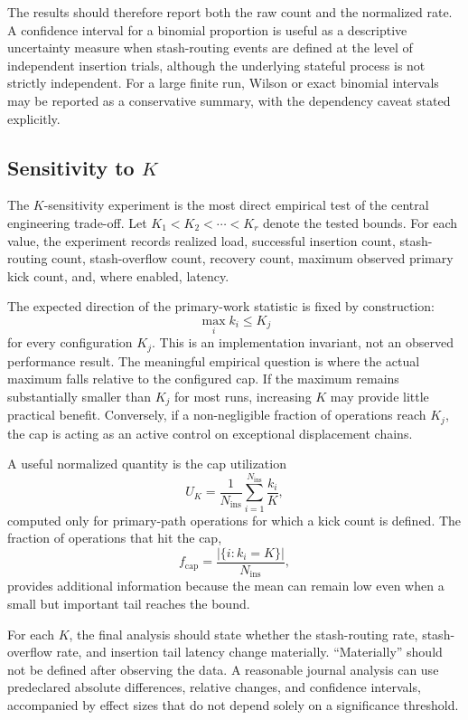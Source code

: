 \documentclass[conference]{IEEEtran}
\begin{document}
The results should therefore report both the raw count and the normalized rate. A confidence interval for a binomial proportion is useful as a descriptive uncertainty measure when stash-routing events are defined at the level of independent insertion trials, although the underlying stateful process is not strictly independent. For a large finite run, Wilson or exact binomial intervals may be reported as a conservative summary, with the dependency caveat stated explicitly.

\subsection{Sensitivity to $K$}
\label{subsec:k_results}

The $K$-sensitivity experiment is the most direct empirical test of the central engineering trade-off. Let $K_1<K_2<\cdots<K_r$ denote the tested bounds. For each value, the experiment records realized load, successful insertion count, stash-routing count, stash-overflow count, recovery count, maximum observed primary kick count, and, where enabled, latency.

The expected direction of the primary-work statistic is fixed by construction:
\begin{equation}
\max_i k_i \leq K_j
\end{equation}
for every configuration $K_j$. This is an implementation invariant, not an observed performance result. The meaningful empirical question is where the actual maximum falls relative to the configured cap. If the maximum remains substantially smaller than $K_j$ for most runs, increasing $K$ may provide little practical benefit. Conversely, if a non-negligible fraction of operations reach $K_j$, the cap is acting as an active control on exceptional displacement chains.

A useful normalized quantity is the cap utilization
\begin{equation}
U_K = \frac{1}{N_{\mathrm{ins}}}
\sum_{i=1}^{N_{\mathrm{ins}}}
\frac{k_i}{K},
\end{equation}
computed only for primary-path operations for which a kick count is defined. The fraction of operations that hit the cap,
\begin{equation}
f_{\mathrm{cap}} =
\frac{|\{i:k_i=K\}|}{N_{\mathrm{ins}}},
\end{equation}
provides additional information because the mean can remain low even when a small but important tail reaches the bound.

For each $K$, the final analysis should state whether the stash-routing rate, stash-overflow rate, and insertion tail latency change materially. ``Materially'' should not be defined after observing the data. A reasonable journal analysis can use predeclared absolute differences, relative changes, and confidence intervals, accompanied by effect sizes that do not depend solely on a significance threshold.
\end{document}
